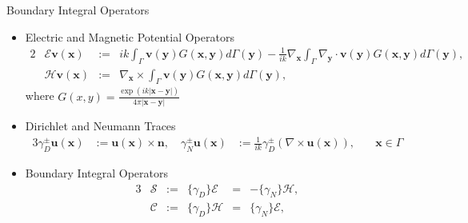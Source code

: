 \documentclass[12pt]{beamer}
\begin{document}
\begin{frame}{Boundary Integral Operators}
\begin{footnotesize}
    \begin{itemize}
        \item Electric and Magnetic Potential Operators
            \begin{alignat}{2}
                &\mathcal{E} \mathbf{v}(\mathbf{x}) &:=& ik \int _{\Gamma} \mathbf{v}(\mathbf{y}) G (\mathbf{x}, \mathbf{y}) d \Gamma (\mathbf{y}) - \frac{1}{ik} \nabla_\mathbf{x} \int _\Gamma \nabla_\mathbf{y} \cdot \mathbf{v}(\mathbf{y}) G (\mathbf{x}, \mathbf{y}) d\Gamma (\mathbf{y}), \nonumber\\
                &\mathcal{H} \mathbf{v}(\mathbf{x}) &:=& \nabla_\mathbf{x} \times \int _\Gamma \mathbf{v}(\mathbf{y}) G (\mathbf{x}, \mathbf{y}) d \Gamma (\mathbf{y}), \nonumber 
            \end{alignat}
            where $G (x,y) = \frac{\exp (ik | \mathbf{x} - \mathbf{y}|)}{4 \pi | \mathbf{x} - \mathbf{y}|}$
        \item Dirichlet and Neumann Traces
            \begin{alignat}{3}
                \gamma_{D}^{\pm} \mathbf{u} (\mathbf{x}) &:= \mathbf{u}(\mathbf{x}) \times \mathbf{n}, \quad 
                \gamma_{N}^{\pm} \mathbf{u}(\mathbf{x}) &:= \frac{1}{ik} \gamma_{D}^{\pm} \left( \nabla \times \mathbf{u}(\mathbf{x}) \right), \quad &\mathbf{x} \in \Gamma \nonumber 
            \end{alignat}
        \item Boundary Integral Operators
            \begin{alignat}{3}
                &\mathcal{S} &:=& \{ \gamma_D \}\mathcal{E} &=& -\{ \gamma_{N} \} \mathcal{H}, \nonumber \\
                &\mathcal{C} &:=& \{ \gamma _{D} \} \mathcal{H} &=& \{ \gamma _{N} \} \mathcal{E}, \nonumber 
            \end{alignat}
    \end{itemize}
\end{footnotesize}
\end{frame}
\end{document}
